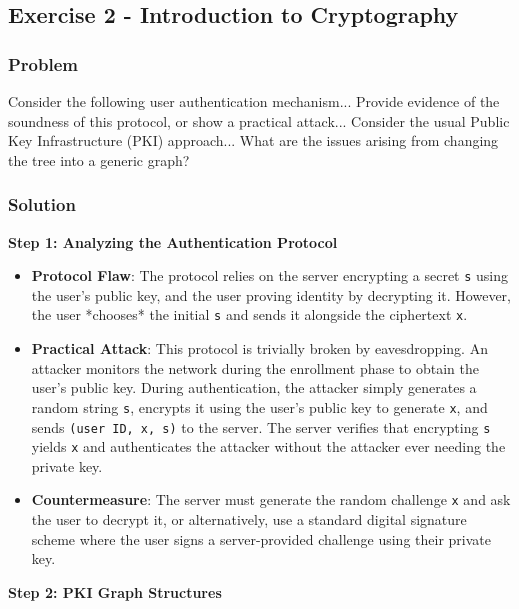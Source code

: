 \documentclass{article}
\begin{document}
\subsection{Exercise 2 - Introduction to Cryptography}
\subsubsection*{Problem}
Consider the following user authentication mechanism... Provide evidence of the soundness of this protocol, or show a practical attack... Consider the usual Public Key Infrastructure (PKI) approach... What are the issues arising from changing the tree into a generic graph?

\subsubsection*{Solution}
\textbf{Step 1: Analyzing the Authentication Protocol}
\begin{itemize}
    \item \textbf{Protocol Flaw}: The protocol relies on the server encrypting a secret \texttt{s} using the user's public key, and the user proving identity by decrypting it. However, the user *chooses* the initial \texttt{s} and sends it alongside the ciphertext \texttt{x}.
    \item \textbf{Practical Attack}: This protocol is trivially broken by eavesdropping. An attacker monitors the network during the enrollment phase to obtain the user's public key. During authentication, the attacker simply generates a random string \texttt{s}, encrypts it using the user's public key to generate \texttt{x}, and sends \texttt{(user ID, x, s)} to the server. The server verifies that encrypting \texttt{s} yields \texttt{x} and authenticates the attacker without the attacker ever needing the private key.
    \item \textbf{Countermeasure}: The server must generate the random challenge \texttt{x} and ask the user to decrypt it, or alternatively, use a standard digital signature scheme where the user signs a server-provided challenge using their private key.

\end{itemize}
\textbf{Step 2: PKI Graph Structures}
\end{document}
